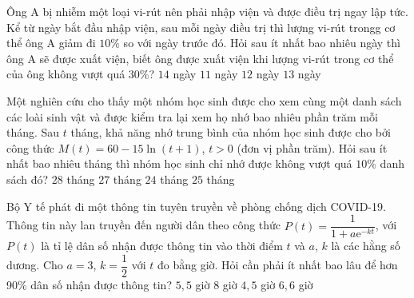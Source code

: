 \begin{ex}
	Ông A bị nhiễm một loại vi-rút nên phải nhập viện và được điều trị ngay lập tức. Kể từ ngày bắt đầu nhập viện, sau mỗi ngày điều trị thì lượng vi-rút trongg cơ thể ông A giảm đi $10\%$ so với ngày trước đó. Hỏi sau ít nhất bao nhiêu ngày thì ông A sẽ được xuất viện, biết ông được xuất viện khi lượng vi-rút trong cơ thể của ông không vượt quá $30\%$?
	\choice
	{$14$ ngày}
	{$11$ ngày}
	{\True $12$ ngày}
	{$13$ ngày}
\end{ex}
\begin{ex}
	Một nghiên cứu cho thấy một nhóm học sinh được cho xem cùng một danh sách các loài sinh vật và được kiểm tra lại xem họ nhớ bao nhiêu phần trăm mỗi tháng. Sau $t$ tháng, khả năng nhớ trung bình của nhóm học sinh được cho bởi công thức $M(t)=60-15 \ln (t+1)$, $t>0$ (đơn vị phần trăm). Hỏi sau ít nhất bao nhiêu tháng thì nhóm học sinh chỉ nhớ được không vượt quá $10\%$ danh sách đó?
	\choice
	{\True $28$ tháng}
	{$27$ tháng}
	{$24$ tháng}
	{$25$ tháng}
\end{ex}
\begin{ex}
	Bộ Y tế phát đi một thông tin tuyên truyền về phòng chống dịch COVID-19. Thông tin này lan truyền đến người dân theo công thức $P(t)=\dfrac{1}{1+a\mathrm{e}^{-kt}}$, với $P(t)$ là tỉ lệ dân số nhận được thông tin vào thời điểm $t$ và $a$, $k$ là các hằng số dương. Cho $a=3$, $k=\dfrac{1}{2}$ với $t$ đo bằng giờ. Hỏi cần phải ít nhất bao lâu để hơn 90\% dân số nhận được thông tin?
	\choice
	{$5{,}5$ giờ}
	{$8$ giờ}
	{$4{,}5$ giờ}
	{\True $6{,}6$ giờ}
\end{ex}

